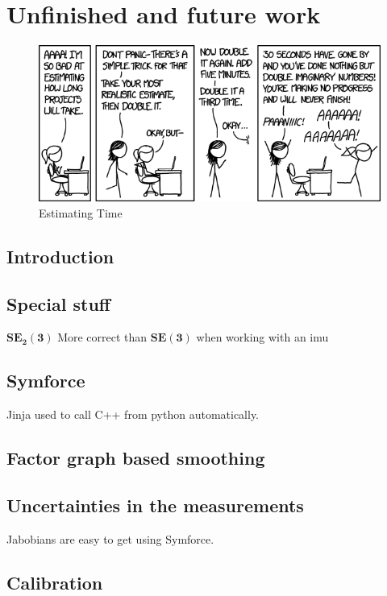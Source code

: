 \chapter{Unfinished and future work}
\begin{figure}[H]
    \centering
    \includegraphics[width=\textwidth]{figures/estimating_time.png}
    \caption{Estimating Time \cite{xkcdEstimatingTime2016}}
    \label{fig:xkcd_time}
\end{figure}

\section{Introduction}


\section{Special stuff}
$\mathbf{SE_2(3)}$
More correct than $\mathbf{SE(3)}$ when working with an \gls{imu}

\section{Symforce}
Jinja used to call C++ from python automatically.

\section{Factor graph based smoothing}

\section{Uncertainties in the measurements}
Jabobians are easy to get using Symforce.

\section{Calibration}
